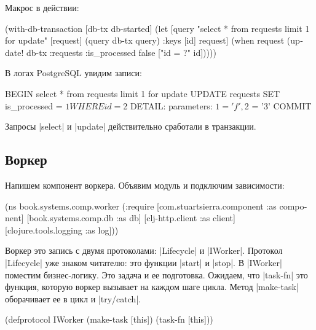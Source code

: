 Макрос в действии:

\begin{english}
  \begin{clojure}
(with-db-transaction
  [db-tx db-started]
  (let [query "select * from requests limit 1 for update"
        [request] (query db-tx query)
        {:keys [id]} request]
    (when request
      (update! db-tx :requests
               {:is_processed false}
               ["id = ?" id]))))
  \end{clojure}
\end{english}

В логах PostgreSQL увидим записи:

\begin{english}
  \begin{sql}
BEGIN
select * from requests limit 1 for update
UPDATE requests SET is_processed = $1 WHERE id = $2
DETAIL:  parameters: $1 = 'f', $2 = '3'
COMMIT
  \end{sql}
\end{english}

Запросы \spverb|select| и \spverb|update| действительно сработали в транзакции.

\subsection{Воркер}

Напишем компонент воркера. Объявим модуль и подключим зависимости:

\begin{english}
  \begin{clojure}
(ns book.systems.comp.worker
  (:require
   [com.stuartsierra.component :as component]
   [book.systems.comp.db :as db]
   [clj-http.client :as client]
   [clojure.tools.logging :as log]))
  \end{clojure}
\end{english}

Воркер это запись с двумя протоколами: \spverb|Lifecycle| и
\spverb|IWorker|. Протокол \spverb|Lifecycle| уже знаком читателю: это функции
\spverb|start| и \spverb|stop|. В \spverb|IWorker| поместим бизнес-логику. Это
задача и ее подготовка. Ожидаем, что \spverb|task-fn| это функция, которую
воркер вызывает на каждом шаге цикла. Метод \spverb|make-task| оборачивает ее в
цикл и \spverb|try/catch|.

\begin{english}
  \begin{clojure}
(defprotocol IWorker
  (make-task [this])
  (task-fn [this]))
  \end{clojure}
\end{english}

